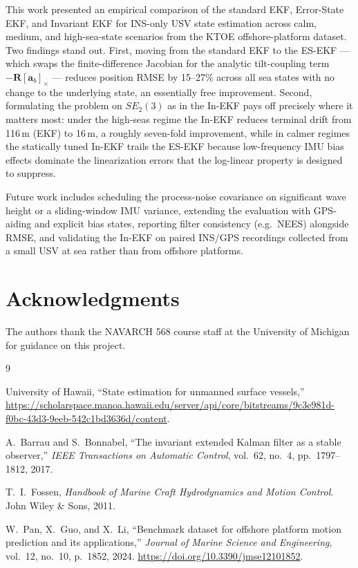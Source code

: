 \documentclass[conference]{IEEEtran}
\begin{document}
This work presented an empirical comparison of the standard EKF, Error-State EKF, and Invariant EKF for INS-only USV state estimation across calm, medium, and high-sea-state scenarios from the KTOE offshore-platform dataset. Two findings stand out. First, moving from the standard EKF to the ES-EKF --- which swaps the finite-difference Jacobian for the analytic tilt-coupling term $-\mathbf{R}[\mathbf{a}_b]_\times$ --- reduces position RMSE by 15--27\% across all sea states with no change to the underlying state, an essentially free improvement. Second, formulating the problem on $SE_2(3)$ as in the In-EKF pays off precisely where it matters most: under the high-seas regime the In-EKF reduces terminal drift from 116\,m (EKF) to 16\,m, a roughly seven-fold improvement, while in calmer regimes the statically tuned In-EKF trails the ES-EKF because low-frequency IMU bias effects dominate the linearization errors that the log-linear property is designed to suppress.

Future work includes scheduling the process-noise covariance on significant wave height or a sliding-window IMU variance, extending the evaluation with GPS-aiding and explicit bias states, reporting filter consistency (e.g.\ NEES) alongside RMSE, and validating the In-EKF on paired INS/GPS recordings collected from a small USV at sea rather than from offshore platforms.

\section*{Acknowledgments}

The authors thank the NAVARCH 568 course staff at the University of Michigan for guidance on this project.


\begin{thebibliography}{9}

University of Hawaii, ``State estimation for unmanned surface vessels,''
\url{https://scholarspace.manoa.hawaii.edu/server/api/core/bitstreams/9c3e981d-f0bc-43d3-9eeb-542c1bd3636d/content}.

A.~Barrau and S.~Bonnabel, ``The invariant extended Kalman filter as a stable observer,''
\textit{IEEE Transactions on Automatic Control}, vol.~62, no.~4, pp.~1797--1812, 2017.

T.~I.~Fossen, \textit{Handbook of Marine Craft Hydrodynamics and Motion Control}.
John Wiley \& Sons, 2011.

W.~Pan, X.~Guo, and X.~Li, ``Benchmark dataset for offshore platform motion prediction and its applications,''
\textit{Journal of Marine Science and Engineering}, vol.~12, no.~10, p.~1852, 2024.
\url{https://doi.org/10.3390/jmse12101852}.

\end{thebibliography}
\end{document}
